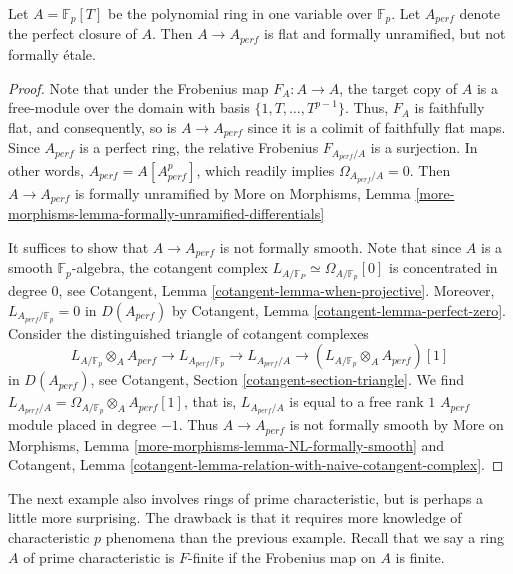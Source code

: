 \begin{lemma}
\label{lemma-perfect-closure-polynomial-ring}
Let $A = \mathbb{F}_p[T]$ be the polynomial ring in one variable over
$\mathbb{F}_p$. Let $A_{perf}$  denote the perfect closure of $A$.
Then $A \rightarrow A_{perf}$ is flat and formally unramified,
but not formally \'etale.
\end{lemma}

\begin{proof}
Note that under the Frobenius map $F_A : A \to A$, the target copy of $A$
is a free-module over the domain with basis $\{1, T, \dots, T^{p - 1}\}$.
Thus, $F_A$ is faithfully flat, and consequently,  so is
$A \to A_{perf}$ since it is a colimit of faithfully flat maps.
Since $A_{perf}$ is a perfect ring, the relative Frobenius
$F_{A_{perf}/A}$ is a surjection. In  other words,
$A_{perf} = A[A_{perf}^p]$, which readily implies
$\Omega_{A_{perf}/A} = 0$. Then
$A \rightarrow A_{perf}$ is formally unramified by
More on Morphisms, Lemma
\ref{more-morphisms-lemma-formally-unramified-differentials}

\medskip\noindent
It suffices to show that $A \rightarrow A_{perf}$
is not formally smooth. Note that since $A$ is a
smooth $\mathbb{F}_p$-algebra, the cotangent complex
$L_{A/\mathbb{F}_P} \simeq \Omega_{A/\mathbb{F}_p}[0]$
is concentrated in degree $0$, see
Cotangent, Lemma \ref{cotangent-lemma-when-projective}. Moreover,
$L_{A_{perf}/\mathbb{F}_p} = 0$ in $D(A_{perf})$
by Cotangent, Lemma \ref{cotangent-lemma-perfect-zero}.
Consider the distinguished triangle of cotangent complexes
$$
L_{A/\mathbb{F}_p} \otimes_A A_{perf} \to
L_{A_{perf}/\mathbb{F}_p} \to
L_{A_{perf}/A} \to
(L_{A/\mathbb{F}_p} \otimes_A A_{perf})[1]
$$
in $D(A_{perf})$, see Cotangent, Section \ref{cotangent-section-triangle}.
We find $L_{A_{perf}/A} = \Omega_{A/\mathbb{F}_p} \otimes_A A_{perf}[1]$,
that is, $L_{A_{perf}/A}$ is equal to a free rank $1$ $A_{perf}$
module placed in degree $-1$. Thus $A \rightarrow A_{perf}$
is not formally smooth by
More on Morphisms, Lemma \ref{more-morphisms-lemma-NL-formally-smooth}
and
Cotangent, Lemma \ref{cotangent-lemma-relation-with-naive-cotangent-complex}.
\end{proof}

\noindent
The next example also involves rings of prime characteristic, but is perhaps
a little more surprising. The drawback is that it requires more knowledge of
characteristic $p$ phenomena than the previous example. Recall that we say a
ring $A$ of prime characteristic is $F$-finite if the Frobenius map on $A$
is finite. 

